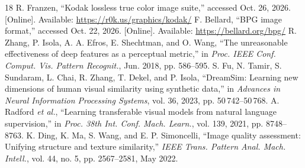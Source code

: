 \begin{thebibliography}{18}
 R. Franzen, ``Kodak lossless true color image suite,'' accessed Oct. 26, 2026. [Online]. Available: \url{https://r0k.us/graphics/kodak/}
 F. Bellard, ``BPG image format,'' accessed Oct. 22, 2026. [Online]. Available: \url{https://bellard.org/bpg/}
 R. Zhang, P. Isola, A. A. Efros, E. Shechtman, and O. Wang, ``The unreasonable effectiveness of deep features as a perceptual metric,'' in \emph{Proc. IEEE Conf. Comput. Vis. Pattern Recognit.}, Jun. 2018, pp. 586--595.
 S. Fu, N. Tamir, S. Sundaram, L. Chai, R. Zhang, T. Dekel, and P. Isola, ``DreamSim: Learning new dimensions of human visual similarity using synthetic data,'' in \emph{Advances in Neural Information Processing Systems}, vol. 36, 2023, pp. 50\,742--50\,768.
 A. Radford \emph{et al.}, ``Learning transferable visual models from natural language supervision,'' in \emph{Proc. 38th Int. Conf. Mach. Learn.}, vol. 139, 2021, pp. 8748--8763.
 K. Ding, K. Ma, S. Wang, and E. P. Simoncelli, ``Image quality assessment: Unifying structure and texture similarity,'' \emph{IEEE Trans. Pattern Anal. Mach. Intell.}, vol. 44, no. 5, pp. 2567--2581, May 2022.
\end{thebibliography}

